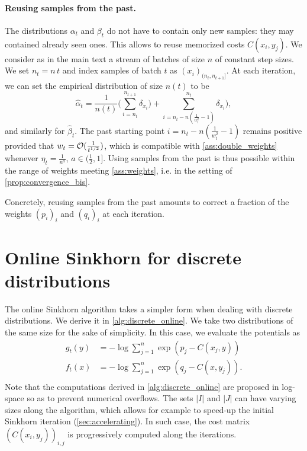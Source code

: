 \paragraph{Reusing samples from the past.} The distributions $\alpha_t$ and
$\beta_t$ do not have to contain only new samples: they may contained already
seen ones. This allows to reuse memorized costs $C(x_i, y_j)$. We consider as
in the main text a stream of batches of size $n$ of constant step sizes. We set
$n_t = n\,t$ and index samples of batch $t$ as ${(x_i)}_{(n_t,n_{t+1}]}$. At
each iteration, we can set the empirical distribution of size $n(t)$ to be
\begin{equation}
    \hat \alpha_t = \frac{1}{n(t)} \Big( \sum_{i=n_t}^{n_{t+1}} \delta_{x_i}) + 
    \sum_{i=n_t - n (\frac{1}{w_t^2} - 1)}^{n_t} \delta_{x_i} \Big),
\end{equation}
and similarly for $\hat \beta_t$. The past starting point $i=n_t - n
(\frac{1}{w_t^2} - 1)$ remains positive provided that $w_t =
\mathcal{O}(\frac{1}{t^{1/2}})$, which is compatible with \autoref{ass:double_weights}
whenever $\eta_t = \frac{1}{n^a}$, $a \in (\frac{1}{2}, 1]$. Using samples from
the past is thus possible within the range of weights meeting \autoref{ass:weights}, i.e. in the setting of \autoref{prop:convergence_bis}.

Concretely, reusing samples
from the past amounts to correct a fraction of the weights ${(p_i)}_i$ and
${(q_i)}_i$ at each iteration.

\section{Online Sinkhorn for discrete distributions}\label{sec:sinkhorn_discrete}

The online Sinkhorn algorithm takes a simpler form when dealing with discrete
distributions. We derive it in \autoref{alg:discrete_online}. We take two
distributions of the same size for the sake of simplicity. In this case, we evaluate the potentials as
\begin{align}
    g_t(y) &= - \log \sum_{j=1}^n \exp(p_j - C(x_j, y)) \\
    f_t(x) &= - \log \sum_{j=1}^n \exp(q_j - C(x, y_j)). \\
\end{align}
Note that the computations derived in \autoref{alg:discrete_online} are proposed
in log-space so as to prevent numerical overflows. The sets $|I|$ and $|J|$ can
have varying sizes along the algorithm, which allows for example to speed-up the
initial Sinkhorn iteration (\autoref{sec:accelerating}). In such case, the
cost matrix $(C(x_i,y_j))_{i,j}$ is progressively computed along the iterations.

